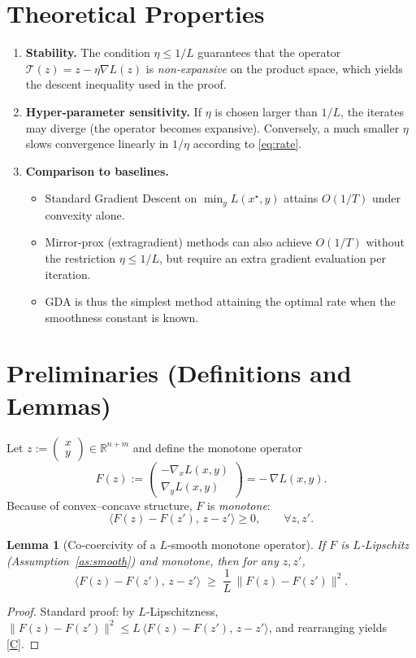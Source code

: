 \documentclass{article}
\newtheorem{lemma}{Lemma}
\begin{document}
\section*{Theoretical Properties}
\begin{enumerate}[label=\arabic*)]
\item \textbf{Stability.} The condition $\eta\le 1/L$ guarantees that the operator $\mathcal{T}(z)=z-\eta \nabla L(z)$ is \emph{non‑expansive} on the product space, which yields the descent inequality used in the proof.
\item \textbf{Hyper‑parameter sensitivity.} If $\eta$ is chosen larger than $1/L$, the iterates may diverge (the operator becomes expansive). Conversely, a much smaller $\eta$ slows convergence linearly in $1/\eta$ according to \eqref{eq:rate}.
\item \textbf{Comparison to baselines.}
    \begin{itemize}
        \item Standard Gradient Descent on $\min_{y}L(x^{\star},y)$ attains $O(1/T)$ under convexity alone.
        \item Mirror‑prox (extragradient) methods can also achieve $O(1/T)$ without the restriction $\eta\le1/L$, but require an extra gradient evaluation per iteration.
        \item GDA is thus the simplest method attaining the optimal rate when the smoothness constant is known.
    \end{itemize}
\end{enumerate}

\section*{Preliminaries (Definitions and Lemmas)}
Let $z:=\begin{pmatrix}x\\ y\end{pmatrix}\in\mathbb{R}^{n+m}$ and define the monotone operator
\[
F(z):=\begin{pmatrix}
-\nabla_{x}L(x,y)\\[1mm]
\nabla_{y}L(x,y)
\end{pmatrix}
 = -\,\nabla L(x,y).
\]
Because of convex–concave structure, $F$ is \emph{monotone}:
\[
\langle F(z)-F(z'),\,z-z'\rangle \ge 0,\qquad \forall z,z'. \tag{M}
\]
\begin{lemma}[Co‑coercivity of a $L$‑smooth monotone operator]\label{lem:coco}
If $F$ is $L$‑Lipschitz (Assumption~\ref{as:smooth}) and monotone, then for any $z,z'$,
\[
\langle F(z)-F(z'),\,z-z'\rangle \;\ge\; \frac{1}{L}\,\|F(z)-F(z')\|^{2}. \tag{C}
\]
\end{lemma}
\begin{proof}
Standard proof: by $L$‑Lipschitzness,
$\|F(z)-F(z')\|^{2}\le L\,\langle F(z)-F(z'),\,z-z'\rangle$, and rearranging yields \eqref{C}. \qedhere
\end{proof}
\end{document}
